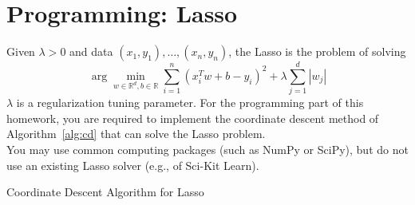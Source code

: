 \documentclass{article}
\newcommand{\field}[1]{\mathbb{#1}}
\newcommand{\1}{\mathbf{1}}
\newcommand{\R}{\field{R}} %
\begin{document}
\section{Programming: Lasso}

Given $\lambda >0$ and data $(x_1,y_1),\dots,(x_n,y_n)$, the Lasso is the problem of solving
\begin{equation}\label{eq:lasso}
  \arg\min_{{w}\in \R^d, b \in \R} \sum_{i=1}^n { (x_i^T {w} + b - {y}_i)^2 }
    + \lambda \sum_{j=1}^d |{w}_j| 
\end{equation}
$\lambda$ is a regularization tuning parameter.
For the programming part of this homework, you are required to implement the
coordinate descent method of Algorithm~\ref{alg:cd} that can solve the Lasso problem.\\
You may use common computing packages (such as NumPy or SciPy), but do not use an existing Lasso solver (e.g., of Sci-Kit Learn).

\begin{algorithm}[t]
    \caption{Coordinate Descent Algorithm for Lasso}\label{alg:cd}
\end{algorithm}
\end{document}
